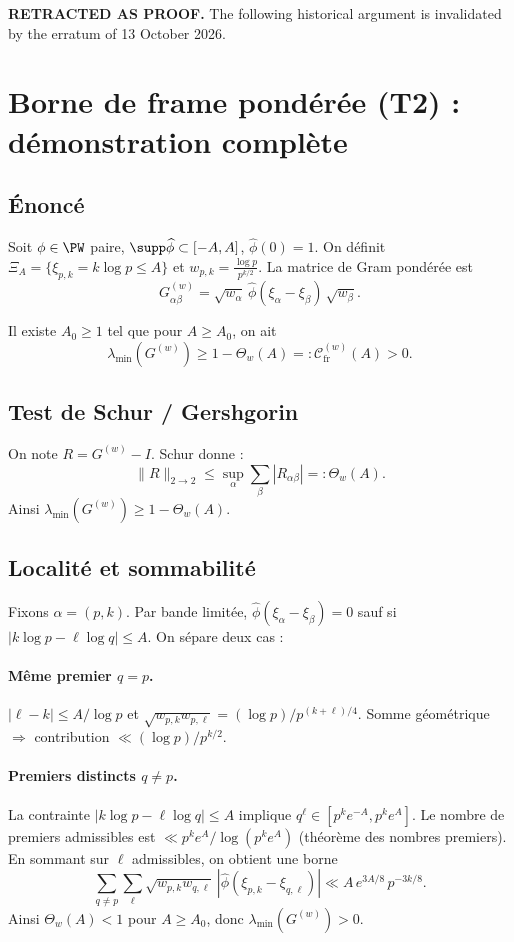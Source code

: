 \par\noindent\textbf{RETRACTED AS PROOF.} The following historical argument is invalidated by the erratum of 13 October 2026.\par
\section{Borne de frame pondérée (T2) : démonstration complète}

\subsection{Énoncé}
Soit $\phi\in\PW$ paire, $\supp\widehat{\phi}\subset[-A,A]$, $\widehat{\phi}(0)=1$.
On définit $\Xi_A=\{\xi_{p,k}=k\log p\le A\}$ et $w_{p,k}=\frac{\log p}{p^{k/2}}$.
La matrice de Gram pondérée est
\[
G^{(w)}_{\alpha\beta}=\sqrt{w_\alpha}\,\widehat{\phi}(\xi_\alpha-\xi_\beta)\,\sqrt{w_\beta}.
\]

\begin{theorem}
Il existe $A_0\ge1$ tel que pour $A\ge A_0$, on ait
\[
\lambda_{\min}(G^{(w)})\ge1-\Theta_w(A)=:\mathcal{C}^{(w)}_{\mathrm{fr}}(A)>0.
\]
\end{theorem}

\subsection{Test de Schur / Gershgorin}
On note $R=G^{(w)}-I$.
Schur donne :
\[
\|R\|_{2\to2}\le
\sup_\alpha\sum_\beta|R_{\alpha\beta}|
=:\Theta_w(A).
\]
Ainsi $\lambda_{\min}(G^{(w)})\ge1-\Theta_w(A)$.

\subsection{Localité et sommabilité}
Fixons $\alpha=(p,k)$.
Par bande limitée, $\widehat{\phi}(\xi_\alpha-\xi_\beta)=0$ sauf si $|k\log p-\ell\log q|\le A$.
On sépare deux cas :

\paragraph{Même premier $q=p$.}
$|\ell-k|\le A/\log p$ et
$\sqrt{w_{p,k}w_{p,\ell}}=(\log p)/p^{(k+\ell)/4}$.
Somme géométrique $\Rightarrow$ contribution $\ll(\log p)/p^{k/2}$.

\paragraph{Premiers distincts $q\neq p$.}
La contrainte $|k\log p-\ell\log q|\le A$ implique $q^\ell\in[p^ke^{-A},p^ke^A]$.
Le nombre de premiers admissibles est $\ll p^ke^A/\log(p^ke^A)$ (théorème des nombres premiers).
En sommant sur $\ell$ admissibles, on obtient une borne
\[
\sum_{q\neq p}\sum_\ell
\sqrt{w_{p,k}w_{q,\ell}}\,|\widehat{\phi}(\xi_{p,k}-\xi_{q,\ell})|
\ll
A\,e^{3A/8}\,p^{-3k/8}.
\]
Ainsi $\Theta_w(A)<1$ pour $A\ge A_0$, donc $\lambda_{\min}(G^{(w)})>0$.
